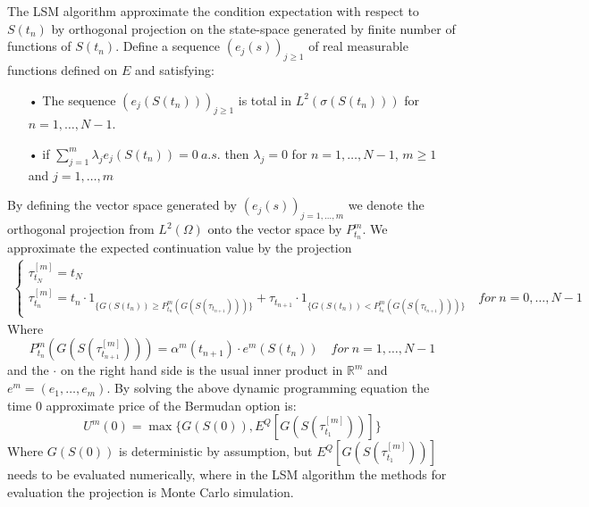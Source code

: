 The LSM algorithm approximate the condition expectation with respect to $S(t_{n})$ by orthogonal projection on the state-space generated by finite number of functions of $S(t_{n})$. Define a sequence $(e_{j}(s))_{j\geq 1}$ of real measurable functions defined on $E$ and satisfying:
\begin{enumerate}\label{AssumptionBasisFck}
\item[•] The sequence $(e_{j}(S(t_n)))_{j\geq 1}$ is total in $L^2(\sigma(S(t_n)))$ for $n=1,\ldots,N-1$.
\item[•] if $\sum_{j=1}^{m} \lambda_j e_{j}(S(t_n))=0 \ a.s.$ then $\lambda_j=0$ for $n=1,\ldots,N-1$, $m\geq 1$ and $j=1,\ldots,m$
\end{enumerate}
By defining the vector space generated by $(e_{j}(s))_{j=1, \ldots, m}$ we denote the orthogonal projection from $L^2(\Omega)$ onto the vector space by $P^m_{t_n}$.
We approximate the expected continuation value by the projection
\begin{equation}\label{LSMDynamic2}
\begin{split}
\begin{cases}
          \tau_{t_N}^{[m]} = t_N\\
          \tau_{t_n}^{[m]} = t_n \cdot 1_{\{G(S(t_n)) \geq P^m_{t_n}(G(S(\tau_{t_{n+1}})))\}} + \tau_{t_{n+1}} \cdot 1_{\{G(S(t_n)) < P^m_{t_n}(G(S(\tau_{t_{n+1}}))) \}} \quad for \ n={0,\ldots,N-1} 
\end{cases}
\end{split}
\end{equation}
Where
$$P^m_{t_n}(G(S(\tau^{[m]}_{t_{n+1}})))=\alpha^{m}(t_{n+1}) \cdot e^m(S(t_{n})) \quad for \ n=1,\ldots,N-1$$
and the $\cdot$ on the right hand side is the usual inner product in $\mathbb{R}^m$ and $e^m=(e_1,\ldots, e_m)$.
By solving the above dynamic programming equation the time 0 approximate price of the Bermudan option is:
$$U^m(0)=\max \{ G(S(0)), E^Q[G(S(\tau^{[m]}_{t_1}))]\}$$
Where $G(S(0))$ is deterministic by assumption, but $E^Q[G(S(\tau^{[m]}_{t_1}))]$ needs to be evaluated numerically, where in the LSM algorithm the methods for evaluation the projection is Monte Carlo simulation.\\

